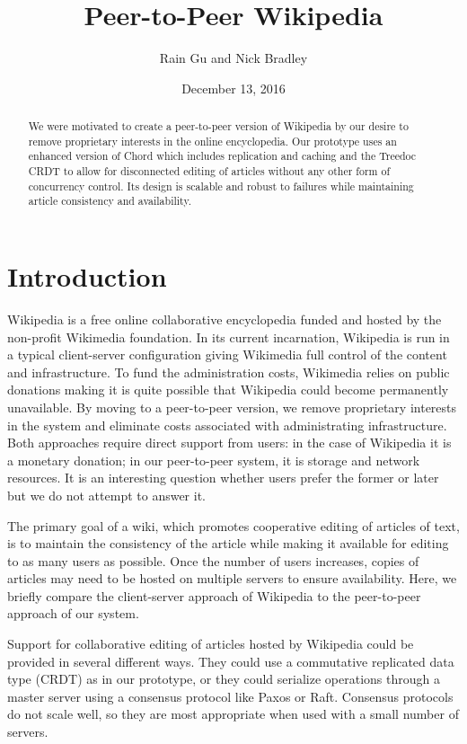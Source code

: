 \documentclass[twocolumn]{article}
\title{Peer-to-Peer Wikipedia}
\author{Rain Gu and Nick Bradley}
\date{December 13, 2016}
\begin{document}
\maketitle

\begin{abstract}
We were motivated to create a peer-to-peer version of Wikipedia by our desire to remove proprietary interests in the online encyclopedia. Our prototype uses an enhanced version of Chord which includes replication and caching and the Treedoc CRDT to allow for disconnected editing of articles without any other form of concurrency control. Its design is scalable and robust to failures while maintaining article consistency and availability.
\end{abstract}

\section{Introduction}
Wikipedia is a free online collaborative encyclopedia funded and hosted by the non-profit Wikimedia foundation. In its current incarnation, Wikipedia is run in a typical client-server configuration giving Wikimedia full control of the content and infrastructure. To fund the administration costs, Wikimedia relies on public donations making it is quite possible that Wikipedia could become permanently unavailable. By moving to a peer-to-peer version, we remove proprietary interests in the system and eliminate costs associated with administrating infrastructure. Both approaches require direct support from users: in the case of Wikipedia it is a monetary donation; in our peer-to-peer system, it is storage and network resources. It is an interesting question whether users prefer the former or later but we do not attempt to answer it.

The primary goal of a wiki, which promotes cooperative editing of articles of text, is to maintain the consistency of the article while making it available for editing to as many users as possible. Once the number of users increases, copies of articles may need to be hosted on multiple servers to ensure availability. Here, we briefly compare the client-server approach of Wikipedia to the peer-to-peer approach of our system.

Support for collaborative editing of articles hosted by Wikipedia could be provided in several different ways. They could use a commutative replicated data type (CRDT) as in our prototype, or they could serialize operations through a master server using a consensus protocol like Paxos or Raft. Consensus protocols do not scale well, so they are most appropriate when used with a small number of servers.
\end{document}
